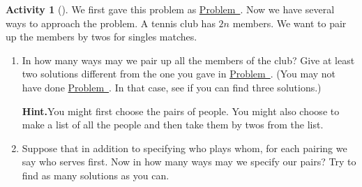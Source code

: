 \documentclass[10pt,]{book}
\theoremstyle{plain}
\theoremstyle{definition}
\newtheorem{activity}[project]{Activity}
\numberwithin{equation}{chapter}
\begin{document}
\begin{activity}[]\label{tennispairings2}
We first gave this problem as \hyperref[tennispairings1a]{Problem~}. Now we have several ways to approach the problem. A tennis club has \(2n\) members. We want to pair up the members by twos for singles matches.%
~\par
\begin{enumerate}[label=(\alph*)]
 \item In how many ways may we pair up all the members of the club? Give at least two solutions different from the one you gave in \hyperref[tennispairings1a]{Problem~}. (You may not have done \hyperref[tennispairings1a]{Problem~}. In that case, see if you can find three solutions.)%

\par\medskip\noindent%
\textbf{Hint.}\quad You might first choose the pairs of people. You might also choose to make a list of all the people and then take them by twos from the list.~\par
\item Suppose that in addition to specifying who plays whom, for each pairing we say who serves first.  Now in how many ways may we specify our pairs? Try to find as many solutions as you can.%


\end{enumerate}
\end{activity}
\end{document}

